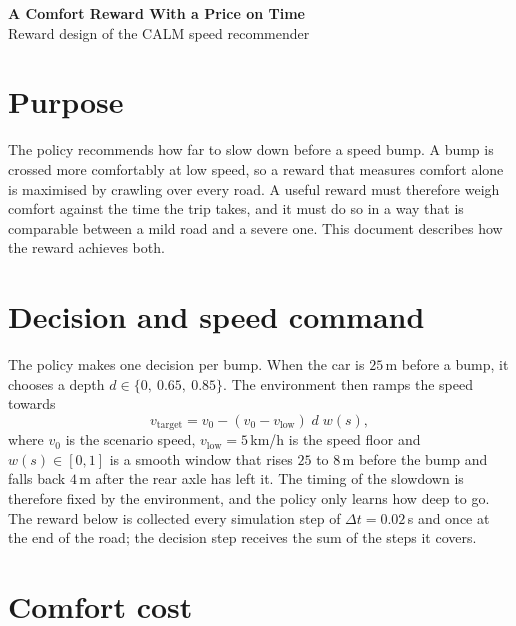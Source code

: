 \documentclass[11pt]{article}
\begin{document}
\begin{center}
{\LARGE\bfseries A Comfort Reward With a Price on Time}\\[0.5em]
{\large Reward design of the CALM speed recommender}
\end{center}
\vspace{0.6em}

\section{Purpose}

The policy recommends how far to slow down before a speed bump. A bump is crossed more comfortably at low speed, so a reward that measures comfort alone is maximised by crawling over every road. A useful reward must therefore weigh comfort against the time the trip takes, and it must do so in a way that is comparable between a mild road and a severe one. This document describes how the reward achieves both.

\section{Decision and speed command}

The policy makes one decision per bump. When the car is $25$\,m before a bump, it chooses a depth $d \in \{0,\ 0.65,\ 0.85\}$. The environment then ramps the speed towards
\begin{equation}
v_{\text{target}} = v_0 - (v_0 - v_{\text{low}})\; d \; w(s),
\end{equation}
where $v_0$ is the scenario speed, $v_{\text{low}} = 5$\,km/h is the speed floor and $w(s)\in[0,1]$ is a smooth window that rises $25$ to $8$\,m before the bump and falls back $4$\,m after the rear axle has left it. The timing of the slowdown is therefore fixed by the environment, and the policy only learns how deep to go. The reward below is collected every simulation step of $\Delta t = 0.02$\,s and once at the end of the road; the decision step receives the sum of the steps it covers.

\section{Comfort cost}
\end{document}
